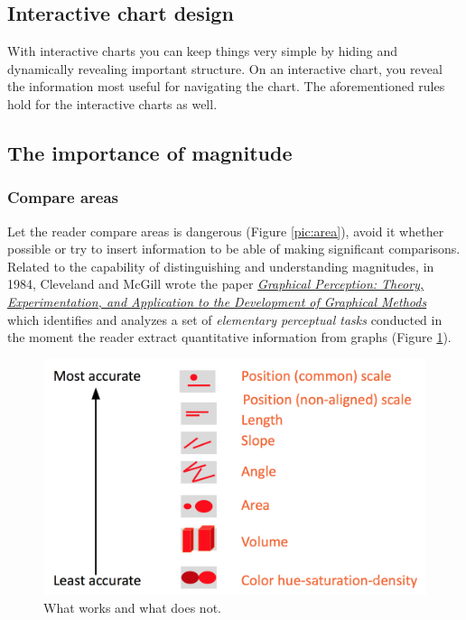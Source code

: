 \subsection*{Interactive chart design}

With interactive charts you can keep things very simple by hiding and dynamically revealing important structure.
On an interactive chart, you reveal the information most useful for navigating the chart. The aforementioned rules hold for the interactive charts as well.

\subsection*{The importance of magnitude}
\subsubsection*{Compare areas}

Let the reader compare areas is dangerous (Figure  \ref{pic:area}), avoid it whether possible or try to insert information to be able of making significant comparisons. Related to the capability of distinguishing and understanding magnitudes, in 1984, Cleveland and McGill wrote the paper
\href{https://www.cs.ubc.ca/\~tmm/courses/cpsc533c-04-spr/readings/cleveland.pdf}{\emph{Graphical Perception: Theory, Experimentation, and Application to the Development of Graphical Methods}} which identifies and analyzes a set of \emph{elementary perceptual tasks} conducted in the moment the reader extract quantitative information from graphs (Figure \ref{pic:magnitude}). 

\begin{figure}[H]%
 \centering
 \includegraphics[width=13cm]{./img/06/magnitude}
 \caption{\label{pic:magnitude} What works and what does not.}
\end{figure}

